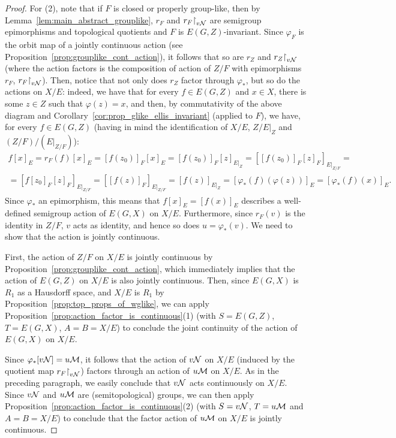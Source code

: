 \begin{proof}
		For (2), note that if $F$ is closed or properly group-like, then by Lemma~\ref{lem:main_abstract_grouplike}, $r_F$ and $r_F\mathord{\upharpoonright}_{v{\mathcal N}}$ are semigroup epimorphisms and topological quotients and $F$ is $E(G,Z)$-invariant. Since $\varphi_F$ is the orbit map of a jointly continuous action (see Proposition~\ref{prop:grouplike_cont_action}), it follows that so are $r_Z$ and $r_Z\mathord{\upharpoonright}_{v{\mathcal N}}$ (where the action factors is the composition of action of $Z/F$ with epimorphisms $r_F$, $r_F\mathord{\upharpoonright}_{v{\mathcal N}}$). Then, notice that not only does $r_Z$ factor through $\varphi_*$, but so do the actions on $X/E$: indeed, we have that for every $f\in E(G,Z)$ and $x\in X$, there is some $z\in Z$ such that $\varphi(z)=x$, and then, by commutativity of the above diagram and Corollary~\ref{cor:prop_glike_ellis_invariant} (applied to $F$), we have, for every $f\in E(G,Z)$ (having in mind the identification of $X/E$, $Z/E|_Z$ and $(Z/F)/(E|_{Z/F})$):
		\begin{multline*}
			f[x]_E=r_F(f)[x]_E=[f(z_0)]_F[x]_E=[f(z_0)]_F[z]_{E|_Z}=[[f(z_0)]_F[z]_F]_{E|_{Z/F}}=\\ =[f[z_0]_F[z]_F]_{E|_{Z/F}}=[[f(z)]_F]_{E|_{Z/F}}=[f(z)]_{E|_Z}=[\varphi_*(f)(\varphi(z))]_E=[\varphi_*(f)(x)]_E.
		\end{multline*}
		Since $\varphi_*$ an epimorphism, this means that $f[x]_E=[f(x)]_E$ describes a well-defined semigroup action of $E(G,X)$ on $X/E$. Furthermore, since $r_F(v)$ is the identity in $Z/F$, $v$ acts as identity, and hence so does $u=\varphi_*(v)$. We need to show that the action is jointly continuous.
		
		First, the action of $Z/F$ on $X/E$ is jointly continuous by Proposition~\ref{prop:grouplike_cont_action}, which immediately implies that the action of $E(G,Z)$ on $X/E$ is also jointly continuous. Then, since $E(G,X)$ is $R_1$ as a Hausdorff space, and $X/E$ is $R_1$ by Proposition~\ref{prop:top_props_of_wglike}, we can apply Proposition~\ref{prop:action_factor_is_continuous}(1) (with $S=E(G,Z)$, $T=E(G,X)$, $A=B=X/E$) to conclude the joint continuity of the action of $E(G,X)$ on $X/E$.
		
		
		Since $\varphi_*[v{\mathcal N}]=u{\mathcal M}$, it follows that the action of $v{\mathcal N}$ on $X/E$ (induced by the quotient map $r_F\mathord{\upharpoonright}_{v{\mathcal N}}$) factors through an action of $u{\mathcal M}$ on $X/E$. As in the preceding paragraph, we easily conclude that $v{\mathcal N}$ acts continuously on $X/E$. Since $v{\mathcal N}$ and $u{\mathcal M}$ are (semitopological) groups, we can then apply Proposition~\ref{prop:action_factor_is_continuous}(2) (with $S=v{\mathcal N}$, $T=u{\mathcal M}$ and $A=B=X/E$) to conclude that the factor action of $u{\mathcal M}$ on $X/E$ is jointly continuous.
		

\end{proof}
